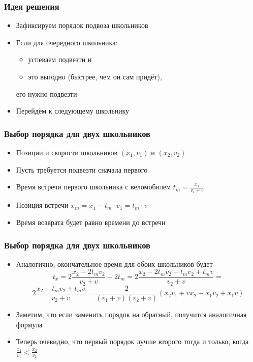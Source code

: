 \begin{frame}
  \frametitle{Идея решения}
  \begin{itemize}
    \item Зафиксируем порядок подвоза школьников
    \item Если для очередного школьника:
       \begin{itemize}
         \item успеваем подвезти и
         \item это выгодно (быстрее, чем он сам придёт),
       \end{itemize}
       его нужно подвезти
    \item Перейдём к следующему школьнику
  \end{itemize}
\end{frame}

\begin{frame}
  \frametitle{Выбор порядка для двух школьников}
  \begin{itemize}
    \item Позиции и скорости школьников $(x_1, v_1)$ и $(x_2, v_2)$
    \item Пусть требуется подвезти сначала первого
    \item Время встречи первого школьника с веломобилем $t_m = \frac{x_1}{v_1 + v}$
    \item Позиция встречи $x_m = x_1 - t_m \cdot v_1 = t_m \cdot v$
    \item Время возврата будет равно времени до встречи
  \end{itemize}
\end{frame}

\begin{frame}
  \frametitle{Выбор порядка для двух школьников}
  \begin{itemize}
    \item Аналогично, окончательное время для обоих школьников будет
      $$
        t_x = 2\frac{x_{2}-2t_{m}v_{2}}{v_{2} + v} + 2t_{m} =
        2\frac{x_{2} - 2t_{m}v_{2} + t_{m}v_{2} + t_{m}v}{v_{2} + v} =
      $$
      $$
        2\frac{x_{2} - t_{m}v_{2} + t_{m}v}{v_{2} + v} =
        \frac{2}{(v_{1} + v)(v_{2} + v)}(x_{2}v_{1} + vx_{2} - x_{1}v_{2} + x_{1}v)
      $$
    \item Заметим, что если заменить порядок на обратный, получится аналогичная формула
    \item Теперь очевидно, что первый порядок лучше второго тогда и только, когда
      $\frac{x_1}{v_1} < \frac{x_2}{v_2}$
  \end{itemize}
\end{frame}

